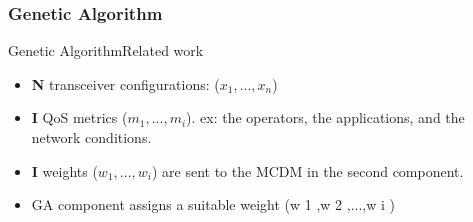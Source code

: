 \subsubsection{Genetic Algorithm}

\begin{frame}{Genetic Algorithm}{Related work \cite{alkhawlani_access_2008a}}
\begin{itemize}
	\item \textbf{N} transceiver configurations: ($x_{1}, ..., x_{n}$)
	\item \textbf{I} QoS metrics ($m_{1}, ..., m_{i}$). ex: the operators, the applications, and the network conditions.
	\item \textbf{I} weights ($w_{1}, ..., w_{i}$) are sent to the MCDM in the second component.
	\item GA component assigns a suitable weight (w 1 ,w 2 ,...,w i )
\end{itemize}
\end{frame}


